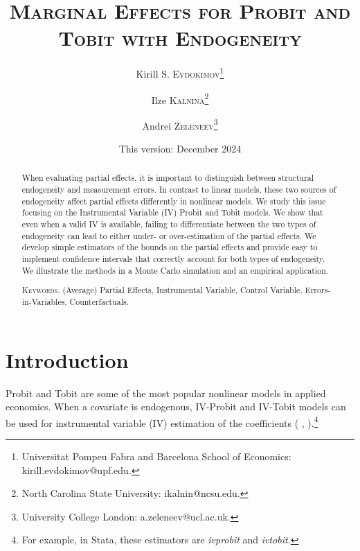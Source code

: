 \documentclass[12pt]{article}
\begin{document}
\title{\textsc{Marginal Effects for Probit and Tobit with Endogeneity}}
\author{Kirill S. \textsc{Evdokimov}\thanks{%
Universitat Pompeu Fabra and Barcelona School of Economics: \textsf{%
kirill.evdokimov@upf.edu}.} \and Ilze \textsc{Kalnina}\thanks{%
North Carolina State University: \textsf{ikalnin@ncsu.edu}.} \and Andrei 
\textsc{Zeleneev}\thanks{%
University College London: \textsf{a.zeleneev@ucl.ac.uk}.\tiny\newline $ $ }}
\date{This version: December 2024}
\maketitle

    \begin{abstract}

      When evaluating partial effects, it is important to distinguish between structural endogeneity and measurement errors. In contrast to linear models, these two sources of endogeneity affect partial effects differently in nonlinear models. We study this issue focusing on the Instrumental Variable (IV) Probit and Tobit models. We show that even when a valid IV is available, failing to differentiate between the two types of endogeneity can lead to either under- or over-estimation of the partial effects. We develop simple estimators of the bounds on the partial effects and provide easy to implement confidence intervals that correctly account for both types of endogeneity. We illustrate the methods in a Monte Carlo simulation and an empirical application.

      \bigskip

      \textsc{Keywords.} (Average) Partial Effects, Instrumental Variable, Control Variable, Errors-in-Variables, Counterfactuals.
    \end{abstract}

\newpage

\section{Introduction}

Probit and Tobit are some of the most popular nonlinear models in applied
economics. When a covariate is endogenous, IV-Probit and IV-Tobit models can
be used for instrumental variable (IV) estimation of the coefficients (%
\citealp{SmithBlundell1986Ecta}, \citealp{RiversVuong1988JoE}).\footnote{%
For example, in Stata, these estimators are \textit{ivprobit} and \textit{%
ivtobit}.}
\end{document}
